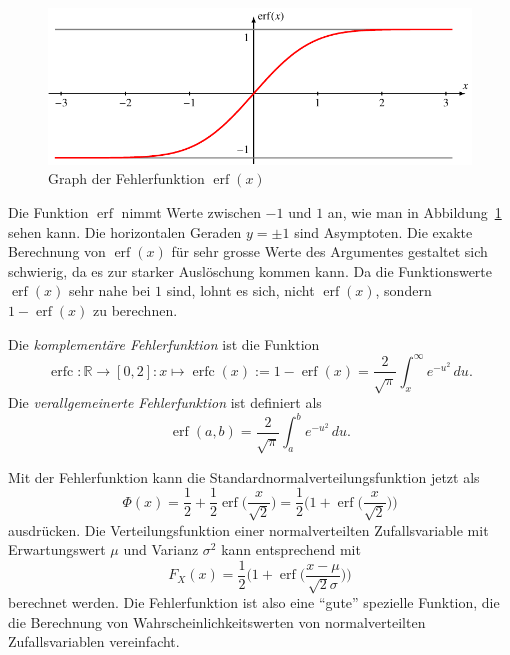 \begin{figure}
\centering
\includegraphics{chapters/060-integral/images/erf.pdf}
\caption{Graph der Fehlerfunktion $\operatorname{erf}(x)$
\label{buch:integrale:fig:erf}}
\end{figure}
Die Funktion $\operatorname{erf}$ nimmt Werte zwischen $-1$ und $1$ an,
wie man in Abbildung~\ref{buch:integrale:fig:erf} sehen kann.
Die horizontalen Geraden $y=\pm 1$ sind Asymptoten.
Die exakte Berechnung von $\operatorname{erf}(x)$ für sehr grosse Werte
des Argumentes gestaltet sich schwierig, da es zur starker Auslöschung
kommen kann.
Da die Funktionswerte $\operatorname{erf}(x)$ sehr nahe bei $1$ sind,
lohnt es sich, nicht $\operatorname{erf}(x)$, sondern $1-\operatorname{erf}(x)$
zu berechnen.

\begin{definition}
Die {\em komplementäre Fehlerfunktion} ist die Funktion
\[
\operatorname{erfc}
\colon
\mathbb{R} \to [0,2]
:
x\mapsto
\operatorname{erfc}(x)
:=
1-\operatorname{erf}(x)
=
\frac{2}{\sqrt{\pi}}\int_x^\infty e^{-u^2}\,du.
\]
Die {\em verallgemeinerte Fehlerfunktion} ist definiert als
%
%
%
\[
\operatorname{erf}(a,b)
=
\frac{2}{\sqrt{\pi}}
\int_a^b e^{-u^2}\,du.
\]
\end{definition}

Mit der Fehlerfunktion kann die Standardnormalverteilungsfunktion jetzt
als
\[
\Phi(x)
=
\frac12
+
\frac12\operatorname{erf}\biggl( \frac{x}{\sqrt{2}} \biggr)
=
\frac12\biggl(
1+\operatorname{erf}\biggl(\frac{x}{\sqrt{2}}\biggr)\biggr)
\]
ausdrücken.
Die Verteilungsfunktion einer normalverteilten Zufallsvariable mit
Erwartungswert $\mu$ und Varianz $\sigma^2$ kann entsprechend mit
\[
F_X(x)
=
\frac12\biggl(
1+\operatorname{erf}\biggl(\frac{x-\mu}{\sqrt{2}\sigma}\biggr)
\biggr)
\]
berechnet werden.
Die Fehlerfunktion ist also eine ``gute'' spezielle Funktion, die
die Berechnung von Wahrscheinlichkeitswerten von normalverteilten
Zufallsvariablen vereinfacht.

